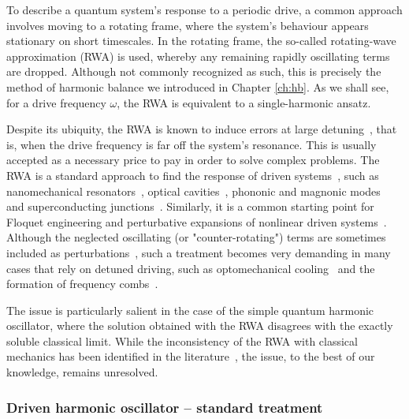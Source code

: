 To describe a quantum system's response to a periodic drive, a common approach involves moving to a rotating frame, where the system’s behaviour appears stationary on short timescales. In the rotating frame, the so-called rotating-wave approximation (RWA) is used, whereby any remaining rapidly oscillating terms are dropped. Although not commonly recognized as such, this is precisely the method of harmonic balance we introduced in Chapter \ref{ch:hb}. As we shall see, for a drive frequency $\omega$, the RWA is equivalent to a single-harmonic ansatz.

Despite its ubiquity, the RWA is known to induce errors at large detuning~\cite{Ann_2021}, that is, when the drive frequency is far off the system's resonance. This is usually accepted as a necessary price to pay in order to solve complex problems. The RWA is a standard approach to find the response of driven systems~\cite{Lorch_2018, Lorch_2019}, such
as nanomechanical resonators~\cite{Bachtold_2022, Heugel_2019, Rocheleau_2010}, optical cavities~\cite{Munoz_2021, Rota_2019, Quach_2022, Ferri_2021, Soriente_2021, Soriente_2020, Delpino_2016}, phononic and magnonic modes~\cite{Xu_2021, Delpino_2021, Li_2021, Qi_2021, Gonzalez-Ballestero_2022, Fukami_2021, Marsh_2021} and superconducting junctions~\cite{Blais_2021, Gu_2017, Xiang_2013}. Similarly, it is a common starting point for Floquet engineering and perturbative expansions of nonlinear driven systems~\cite{Mikami2016, Eckardt2017,Eckardt2015,Bukov2015,Goldman2014}. Although the neglected oscillating (or "counter-rotating") terms are sometimes included as perturbations~\cite{Zheng_2008, Gan_2010, Zhang_2015, Zeuch_2020, Zueco_2009, Wang_2021, Wang_2015, He_2012, Hausinger_2008}, such a treatment becomes very demanding in many cases that rely on detuned driving, such as optomechanical cooling~\cite{Liu_2013, Marquardt_2008} and the formation of frequency combs~\cite{Weng_2022, Herr_2012, Chembo_2016, Lugiato_1987, Lugiato_2018}.

The issue is particularly salient in the case of the simple quantum harmonic oscillator, where the solution obtained with the RWA disagrees with the exactly soluble classical limit. While the inconsistency of the RWA with classical mechanics has been identified in the literature~\cite{Ford_1996}, the issue, to the best of our knowledge, remains unresolved. 

\subsubsection{Driven harmonic oscillator -- standard treatment}

